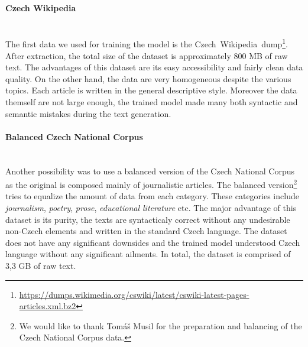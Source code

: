 \paragraph*{Czech Wikipedia} ~\\
\indent The first data we used for training the model is the Czech~Wikipedia~dump\footnote[3]{\url{https://dumps.wikimedia.org/cswiki/latest/cswiki-latest-pages-articles.xml.bz2}}. After extraction, the total size of the dataset is approximately 800 MB of raw text. The advantages of this dataset are its easy accessibility and fairly clean data quality. On the other hand, the data are very homogeneous despite the various topics. Each article is written in the general descriptive style. Moreover the data themself are not large enough, the trained model made many both syntactic and semantic mistakes during the text generation.

\paragraph*{Balanced Czech National Corpus} ~\\
\indent Another possibility was to use a balanced version of the Czech National Corpus\citep{11234/1-4635} as the original is composed mainly of journalistic articles. The balanced version\footnote[4]{We would like to thank Tomáš Musil for the preparation and balancing of the Czech National Corpus data.} tries to equalize the amount of data from each category. These categories include \textit{journalism}, \textit{poetry}, \textit{prose}, \textit{educational literature} etc. The major advantage of this dataset is its purity, the texts are syntacticaly correct without any undesirable non-Czech elements and written in the standard Czech language. The dataset does not have any significant downsides and the trained model understood Czech language without any significant ailments. In total, the dataset is comprised of 3,3 GB of raw text.

